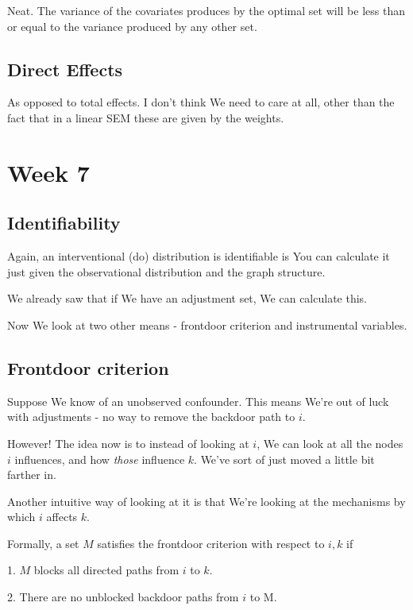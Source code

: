 \documentclass{article}
\begin{document}
		Neat. The variance of the covariates produces by the optimal set will be less than or equal to the variance produced by any other set.
		
	\subsection{Direct Effects}
	
		As opposed to total effects. I don't think We need to care at all, other than the fact that in a linear SEM these are given by the weights.
		 
\section{Week 7}

	\subsection{Identifiability}
	
		Again, an interventional (do) distribution is identifiable is You can calculate it just given the observational distribution and the graph structure.
		
		We already saw that if We have an adjustment set, We can calculate this.
		
		Now We look at two other means - frontdoor criterion and instrumental variables.
		
	\subsection{Frontdoor criterion}
	
		Suppose We know of an unobserved confounder. This means We're out of luck with adjustments - no way to remove the backdoor path to $i$.
		
		However! The idea now is to instead of looking at $i$, We can look at all the nodes $i$ influences, and how \textit{those} influence $k$. We've sort of just moved a little bit farther in.
		
		Another intuitive way of looking at it is that We're looking at the mechanisms by which $i$ affects $k$. 
		
		Formally, a set $M$ satisfies the frontdoor criterion with respect to $i, k$ if
		
		1. $M$ blocks all directed paths from $i$ to $k$.
		
		2. There are no unblocked backdoor paths from $i$ to M.
		
\end{document}
